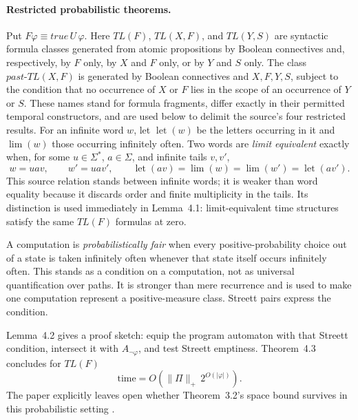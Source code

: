 \paragraph{Restricted probabilistic theorems.}
Put \(F\varphi\equiv \mathit{true}\,U\,\varphi\).  Here \(TL(F)\),
\(TL(X,F)\), and \(TL(Y,S)\) are syntactic formula classes generated from
atomic propositions by Boolean connectives and, respectively, by \(F\) only,
by \(X\) and \(F\) only, or by \(Y\) and \(S\) only.  The class
\(past\text{-}TL(X,F)\) is generated by Boolean connectives and
\(X,F,Y,S\), subject to the condition that no occurrence of \(X\) or \(F\)
lies in the scope of an occurrence of \(Y\) or \(S\).  These names stand for
formula fragments, differ exactly in their permitted temporal constructors,
and are used below to delimit the source's four restricted results.
For an infinite word
\(w\), let \(\operatorname{let}(w)\) be the letters occurring in it and
\(\operatorname{lim}(w)\) those occurring infinitely often.  Two words are
\emph{limit equivalent} exactly when, for some
\(u\in\Sigma^*\), \(a\in\Sigma\), and infinite tails \(v,v'\),
\[
 w=uav,
 \qquad
 w'=uav',
 \qquad
 \operatorname{let}(av)
 =\operatorname{lim}(w)
 =\operatorname{lim}(w')
 =\operatorname{let}(av').
\]
This source relation stands between infinite words; it is weaker than word
equality because it discards order and finite multiplicity in the tails.  Its
distinction is used immediately in Lemma~4.1: limit-equivalent time
structures satisfy the same \(TL(F)\) formulas at zero.

A computation is \emph{probabilistically fair} when every positive-probability
choice out of a state is taken infinitely often whenever that state itself
occurs infinitely often.  This stands as a condition on a computation, not as
universal quantification over paths.  It is stronger than mere recurrence and
is used to make one computation represent a positive-measure class.  Streett
pairs express the condition.

Lemma~4.2 gives a proof sketch: equip the program automaton with that Streett
condition, intersect it with \(A_{\neg\varphi}\), and test Streett emptiness.
Theorem~4.3 concludes for \(TL(F)\)
\[
 \text{time}=O(\lVert\Pi\rVert_+\,2^{O(|\varphi|)}).
\]
The paper explicitly leaves open whether Theorem~3.2's space bound survives
in this probabilistic setting
\cite[preprint pp.~8--9]{VardiWolper1986}.


